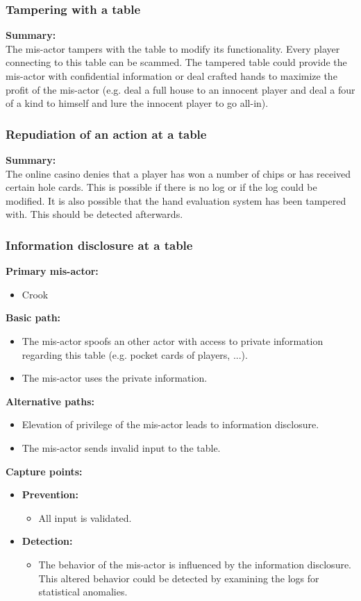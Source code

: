 \documentclass[a4paper,11pt]{report}
\begin{document}
\subsubsection{Tampering with a table}
\label{TableCasesT}
\textbf{Summary:} \\
The mis-actor tampers with the table to modify its functionality. Every player connecting to this table can be scammed. The tampered table could provide the mis-actor with confidential information or deal crafted hands to maximize the profit of the mis-actor (e.g. deal a full house to an innocent player and deal a four of a kind to himself and lure the innocent player to go all-in).
\subsubsection{Repudiation of an action at a table}
\label{TableCasesR}
\textbf{Summary:} \\
The online casino denies that a player has won a number of chips or has received certain hole cards. This is possible if there is no log or if the log could be modified. It is also possible that the hand evaluation system has been tampered with. This should be detected afterwards.
\subsubsection{Information disclosure at a table}
\label{TableCasesI}
\textbf{Primary mis-actor:}
\begin{itemize}
\item Crook
\end{itemize}
\textbf{Basic path:}
\begin{itemize}
\item The mis-actor spoofs an other actor with access to private information regarding this table
(e.g. pocket cards of players, ...).
\item The mis-actor uses the private information.
\end{itemize}
\textbf{Alternative paths:}
\begin{itemize}
\item Elevation of privilege of the mis-actor leads to information disclosure.
\item The mis-actor sends invalid input to the table.
\end{itemize}
\textbf{Capture points:}
\begin{itemize}
\item \textbf{Prevention:}
\begin{itemize}
\item All input is validated.
\end{itemize}
\item \textbf{Detection:}
\begin{itemize}
\item The behavior of the mis-actor is influenced by the information disclosure. This altered behavior could be detected by examining the logs for statistical anomalies.
\end{itemize}
\end{itemize}
\end{document}
